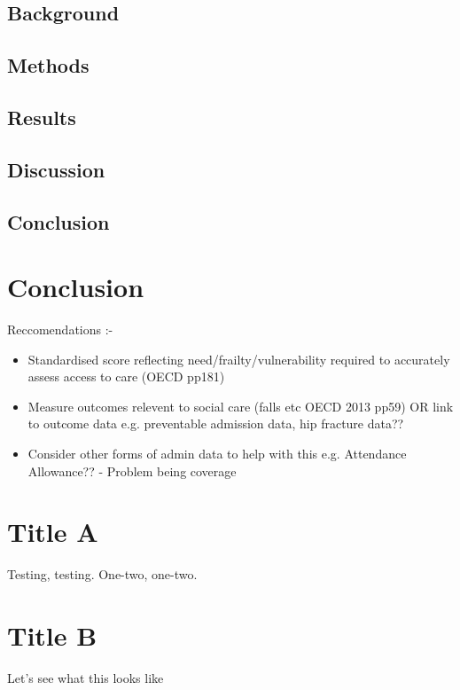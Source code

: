 \documentclass[12pt,]{report}
\begin{document}
\section{Background}\label{sec:sc-outcomes-background}

\section{Methods}\label{sec:sc-outcomes-methods}

\section{Results}\label{sec:sc-outcomes-results}

\section{Discussion}\label{sec:sc-outcomes-discussion}

\section{Conclusion}\label{sec:sc-outcomes-conclusion}

\FloatBarrier
\newpage
{}

\chapter{Conclusion}\label{ch:conclusion}

Reccomendations :-

\begin{itemize}
\item Standardised score reflecting need/frailty/vulnerability required to accurately assess access to care (OECD pp181)
\item Measure outcomes relevent to social care (falls etc OECD 2013 pp59) OR link to outcome data e.g. preventable admission data, hip fracture data??
\item Consider other forms of admin data to help with this e.g. Attendance Allowance?? - Problem being coverage
\end{itemize}

\FloatBarrier
\newpage
{}

\appendix
\chapter{Title A}

Testing, testing. One-two, one-two.

\chapter{Title B}

Let's see what this looks like

\FloatBarrier
\clearpage



\end{document}
